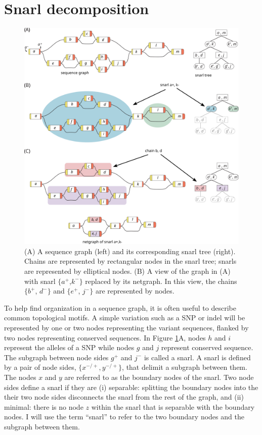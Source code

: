 \documentclass[11pt]{ucscthesis}
\begin{document}
\section{Snarl decomposition}
\begin{figure}
    \centering
    \includegraphics[width=\columnwidth]{snarl_tree.pdf}
    \caption{(A) A sequence graph (left) and its corresponding snarl tree (right). Chains are represented by rectangular nodes in the snarl tree; snarls are represented by elliptical nodes.
    (B) A view of the graph in (A) with snarl $\{a^+$,$k^-\}$ replaced by its netgraph. In this view, the chains $\{b^+$, $d^-\}$ and $\{e^+$, $j^-\}$ are represented by nodes.}
    \label{fig:snarl_tree}
\end{figure}
To help find organization in a sequence graph, it is often useful to describe common topological motifs.
A simple variation such as a SNP or indel will be represented by one or two nodes representing the variant sequences, flanked by two nodes representing conserved sequences.
In Figure \ref{fig:snarl_tree}A, nodes $h$ and $i$ represent the alleles of a SNP while nodes $g$ and $j$ represent conserved sequence.
The subgraph between node sides $g^+$ and $j^-$ is called a snarl.
A snarl is defined by a pair of node sides, $\{x^{-/+}, y^{-/+}\}$, that delimit a subgraph between them.
The nodes $x$ and $y$ are referred to as the boundary nodes of the snarl.
Two node sides define a snarl if they are (i) separable: splitting the boundary nodes into the their two node sides disconnects the snarl from the rest of the graph, and (ii) minimal: there is no node $z$ within the snarl that is separable with the boundary nodes.
I will use the term ``snarl'' to refer to the two boundary nodes and the subgraph between them.
\end{document}

